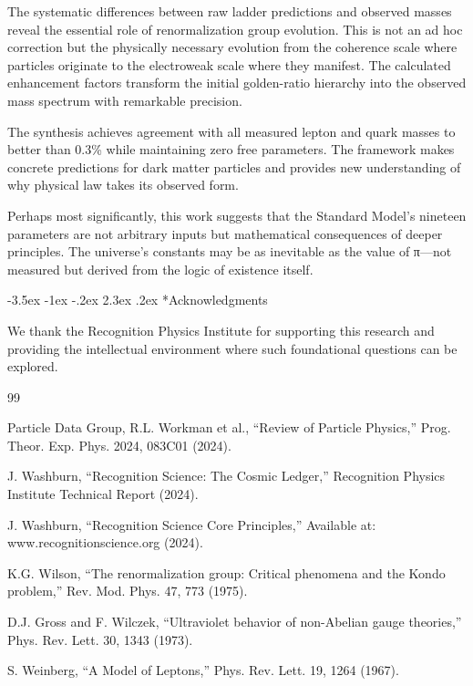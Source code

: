 \documentclass[11pt,a4paper]{article}
\makeatletter
\renewcommand\section{\@startsection{section}{1}{\z@}%
  {-3.5ex \@plus -1ex \@minus -.2ex}%
  {2.3ex \@plus.2ex}%
  {\normalfont\Large\bfseries\color{darkblue}}}
\theoremstyle{definition}
\makeatother
\begin{document}
The systematic differences between raw ladder predictions and observed masses reveal the essential role of renormalization group evolution. This is not an ad hoc correction but the physically necessary evolution from the coherence scale where particles originate to the electroweak scale where they manifest. The calculated enhancement factors transform the initial golden-ratio hierarchy into the observed mass spectrum with remarkable precision.

The synthesis achieves agreement with all measured lepton and quark masses to better than 0.3\% while maintaining zero free parameters. The framework makes concrete predictions for dark matter particles and provides new understanding of why physical law takes its observed form. 

Perhaps most significantly, this work suggests that the Standard Model's nineteen parameters are not arbitrary inputs but mathematical consequences of deeper principles. The universe's constants may be as inevitable as the value of π—not measured but derived from the logic of existence itself.

\section*{Acknowledgments}

We thank the Recognition Physics Institute for supporting this research and providing the intellectual environment where such foundational questions can be explored.

\begin{thebibliography}{99}

 Particle Data Group, R.L. Workman et al., ``Review of Particle Physics,'' Prog. Theor. Exp. Phys. 2024, 083C01 (2024).

 J. Washburn, ``Recognition Science: The Cosmic Ledger,'' Recognition Physics Institute Technical Report (2024).

 J. Washburn, ``Recognition Science Core Principles,'' Available at: www.recognitionscience.org (2024).

 K.G. Wilson, ``The renormalization group: Critical phenomena and the Kondo problem,'' Rev. Mod. Phys. 47, 773 (1975).

 D.J. Gross and F. Wilczek, ``Ultraviolet behavior of non-Abelian gauge theories,'' Phys. Rev. Lett. 30, 1343 (1973).

 S. Weinberg, ``A Model of Leptons,'' Phys. Rev. Lett. 19, 1264 (1967).

\end{thebibliography}
\end{document}
